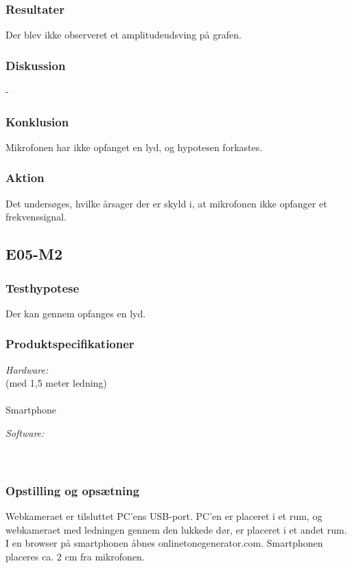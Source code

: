 		\subsubsection{Resultater}
		Der blev ikke observeret et amplitudeudsving på grafen. 
		\subsubsection{Diskussion} 
		-
		\subsubsection{Konklusion}
		Mikrofonen har ikke opfanget en lyd, og hypotesen forkastes. 
		\subsubsection{Aktion}
		Det undersøges, hvilke årsager der er skyld i, at mikrofonen ikke opfanger et frekvenssignal.  
		
	\subsection{E05-M2}
		\subsubsection{Testhypotese}
		Der kan gennem \webcammic{} opfanges en lyd.  
		
		\subsubsection{Produktspecifikationer}
	
			\textit{Hardware:}\\
			\webcammic{} (med 1,5 meter ledning)\\
			\PC\\
			Smartphone
	
			\textit{Software:}\\
			\labview\\
			\onlineg\\
	
		\subsubsection{Opstilling og opsætning}
		Webkameraet er tilsluttet PC'ens USB-port. PC'en er placeret i et rum, og webkameraet med ledningen gennem den lukkede dør, er placeret i et andet rum. I en browser på smartphonen åbnes onlinetonegenerator.com. Smartphonen placeres ca. 2 cm fra mikrofonen.  
			
